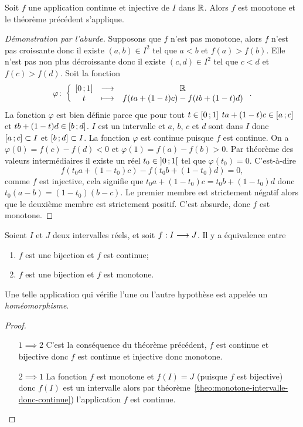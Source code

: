 \begin{theo}
  Soit \(f\) une application continue et injective de \(I\) dans \(\mathbb{R}\). Alors
  \(f\) est monotone et le théorème précédent s'applique.
\end{theo}
\begin{proof}[Démonstration par l'aburde]
  Supposons que \(f\) n'est pas monotone, alors \(f\) n'est pas croissante donc
  il existe \((a,b) \in I^2\) tel que \(a < b\) et \(f(a) > f(b)\). Elle n'est
  pas non plus décroissante donc il existe \((c,d) \in I^2\) tel que \(c < d\)
  et \(f(c) > f(d)\). Soit la fonction
  \begin{equation}
    \varphi\colon\left\{\begin{array}{ccc}\left[ 0 \, ; {} 1 \right] & \longrightarrow &\mathbb{R}\\t & \longmapsto & f(ta+(1-t)c)-f(tb+(1-t)d)\end{array}\right..
  \end{equation}
  La fonction \(\varphi\) est bien définie parce que pour tout \(t \in
  \left[ 0 \, ; {} 1 \right]\) \(ta+(1-t)c \in \left[ a \, ; {} c \right]\) et \(tb+(1-t)d \in
  \left[ b \, ; {} d \right]\). \(I\) est un intervalle et \(a\), \(b\), \(c\) et \(d\)
  sont dans \(I\) donc \(\left[ a \, ; {} c \right] \subset I\) et
  \(\left[ b \, ; {} d \right] \subset I\). La fonction \(\varphi\) est continue
  puisque \(f\) est continue. On a \(\varphi(0)=f(c)-f(d) <0\) et
  \(\varphi(1)=f(a)-f(b) >0\). Par théorème des valeurs intermédiaires il existe
  un réel \(t_0 \in \left] 0 \, ; {} 1 \right[\) tel que \(\varphi(t_0)=0\).
  C'est-à-dire
  \begin{equation}
    f(t_0a+(1-t_0)c)-f(t_0b+(1-t_0)d)=0,
  \end{equation}
  comme \(f\) est injective, cela signifie que \(t_0a+(1-t_0)c=t_0b+(1-t_0)d\)
  donc \(t_0(a-b)=(1-t_0)(b-c)\). Le premier membre est strictement négatif
  alors que le deuxième membre est strictement positif. C'est absurde, donc
  \(f\) est monotone.
\end{proof}
\begin{cor}
  Soient \(I\) et \(J\) deux intervalles réels, et soit \(f:I \longrightarrow{} J\).
  Il y a équivalence entre
  \begin{enumerate}
    \item \(f\) est une bijection et \(f\) est continue;
    \item \(f\) est une bijection et \(f\) est monotone.
  \end{enumerate}
  Une telle application qui vérifie l'une ou l'autre hypothèse est appelée un
  \emph{homéomorphisme}.
\end{cor}
\begin{proof}
  \begin{itemize}
    \item[\(1 \implies 2\)] C'est la conséquence du théorème précédent, \(f\)
      est continue et bijective donc \(f\) est continue et injective donc
      monotone.
    \item[\(2 \implies 1\)] La fonction \(f\) est monotone et \(f(I)=J\)
      (puisque \(f\) est bijective) donc \(f(I)\) est un intervalle alors par
      théorème~\ref{theo:monotone-intervalle-donc-continue}) l'application \(f\)
      est continue.
  \end{itemize}
\end{proof}

